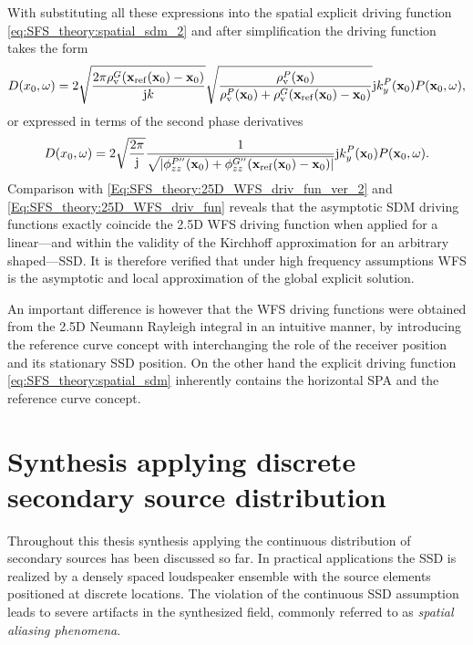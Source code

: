 With substituting all these expressions into the spatial explicit driving function \eqref{eq:SFS_theory:spatial_sdm_2} and after simplification the driving function takes the form
\begin{equation}
D(x_0,\omega) =
\small
2\sqrt{\frac{2\pi  \rho_\mathrm{v}^G(\mathbf{x}_{\mathrm{ref}}(\mathbf{x}_0)-\mathbf{x}_0)}{\mathrm{j} k}} 
\sqrt{\frac{\rho_\mathrm{v}^P(\mathbf{x}_0) }{\rho_\mathrm{v}^P(\mathbf{x}_0) + \rho_\mathrm{v}^G(\mathbf{x}_{\mathrm{ref}}(\mathbf{x}_0)-\mathbf{x}_0)}}
\mathrm{j} k_y^{P}(\mathbf{x}_0)
P(\mathbf{x}_0,\omega),
\end{equation}
or expressed in terms of the second phase derivatives 
\begin{equation}
D(x_0,\omega) =
\small
2\sqrt{\frac{2\pi }{\mathrm{j} }} 
\frac{ 1 }{\sqrt{|\phi^{P''}_{zz}(\mathbf{x}_0) + \phi^{G''}_{zz}(\mathbf{x}_{\mathrm{ref}}(\mathbf{x}_0)-\mathbf{x}_0)|}}
\mathrm{j} k_y^{P}(\mathbf{x}_0)
P(\mathbf{x}_0,\omega).
\end{equation}
Comparison with \eqref{Eq:SFS_theory:25D_WFS_driv_fun_ver_2} and \eqref{Eq:SFS_theory:25D_WFS_driv_fun} reveals that the asymptotic SDM driving functions exactly coincide the 2.5D WFS driving function when applied for a linear---and within the validity of the Kirchhoff approximation for an arbitrary shaped---SSD.
It is therefore verified that under high frequency assumptions WFS is the asymptotic and local approximation of the global explicit solution.

An important difference is however that the WFS driving functions were obtained from the 2.5D Neumann Rayleigh integral in an intuitive manner, by introducing the reference curve concept with interchanging the role of the receiver position and its stationary SSD position. 
On the other hand the explicit driving function \eqref{eq:SFS_theory:spatial_sdm} inherently contains the horizontal SPA and the reference curve concept.

\section{Synthesis applying discrete secondary source distribution}
\label{Sec:Aliasing}

Throughout this thesis synthesis applying the continuous distribution of secondary sources has been discussed so far.
In practical applications the SSD is realized by a densely spaced loudspeaker ensemble with the source elements positioned at discrete locations.
The violation of the continuous SSD assumption leads to severe artifacts in the synthesized field, commonly referred to as \emph{spatial aliasing phenomena}.

